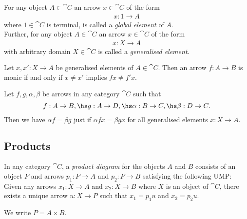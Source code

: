 \documentclass{article}
\begin{document}
\begin{definition}
    For any object $A\in\cat C$ an arrow $x\in\cat C$ of the form
    \begin{align*}
        x: 1 \to A
    \end{align*}
    where $1\in\cat C$ is terminal, is called a \emph{global element}
    of $A$.\\
    Further, for any object $A\in\cat C$ an arrow $x\in\cat C$ of the
    form
    \begin{align*}
        x: X\to A
    \end{align*} 
    with arbitrary domain $X\in\cat C$ is called a \emph{generalised element}.
\end{definition}

\begin{lemma}
    Let $x,x': X\to A$ be generalised elements of $A\in\cat C$. Then an arrow
    $f:A\to B$ is monic if and only if $x\not=x'$ implies $fx\not=f'x$.
\end{lemma}

\begin{lemma}
    Let $f,g,\alpha,\beta$ be arrows in any category $\cat C$ such that
    \begin{align*}
        f:A\to B,\hs g:A\to D,\hs \alpha:B\to C,\hs \beta:D\to C.
    \end{align*}
    Then we have $\alpha f=\beta g$ just if $\alpha f x = \beta g x$ for all generalised
    elements $x:X\to A$.
\end{lemma}

\subsection{Products}

\begin{definition}
    In any category $\cat C$, a \emph{product diagram} for the objects $A$
    and $B$ consists of an object $P$ and arrows $p_1:P\to A$ and $p_2:P\to B$
    satisfying the following UMP: Given any arrows $x_1:X\to A$ and $x_2:X\to B$
    where $X$ is an object of $\cat C$, there exists a unique arrow $u:X\to P$
    such that $x_1=p_1u$ and $x_2=p_2u$.
    \begin{center}
    \end{center}
    We write $P=A\times B$.
\end{definition}
\end{document}
